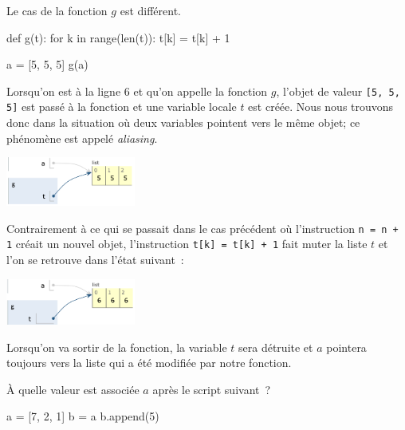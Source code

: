 \documentclass{magnolia}
\begin{document}
Le cas de la fonction $g$ est différent. 

\begin{pythoncode}
def g(t):
    for k in range(len(t)):
        t[k] = t[k] + 1

a = [5, 5, 5]
g(a)
\end{pythoncode}
\noindent
Lorsqu'on est à la ligne 6 et qu'on appelle la fonction $g$, l'objet de valeur \verb![5, 5, 5]! est passé
à la fonction et une variable locale $t$ est créée. Nous nous trouvons donc dans la situation où deux variables
pointent vers le même objet; ce phénomène est appelé \emph{aliasing}.
\begin{center}
\includegraphics[width=0.32\textwidth]{../../Commun/Images/python-cours-tutor-7}
\end{center}
\noindent
Contrairement à ce qui se passait dans le cas précédent où l'instruction \verb!n = n + 1! créait un nouvel
objet, l'instruction \verb!t[k] = t[k] + 1! fait muter la liste $t$ et l'on se retrouve dans l'état
suivant~:
\begin{center}
\includegraphics[width=0.32\textwidth]{../../Commun/Images/python-cours-tutor-8}
\end{center}
\noindent Lorsqu'on va sortir de la fonction, la variable $t$ sera détruite et $a$ pointera toujours vers
la liste qui a été modifiée par notre fonction.
\vspace{2ex}
\begin{exoUnique}
\exo À quelle valeur est associée $a$ après le script suivant~?
\begin{pythoncode}
a = [7, 2, 1]
b = a
b.append(5)
\end{pythoncode}
\end{exoUnique}
\vspace{2ex}
\end{document}

